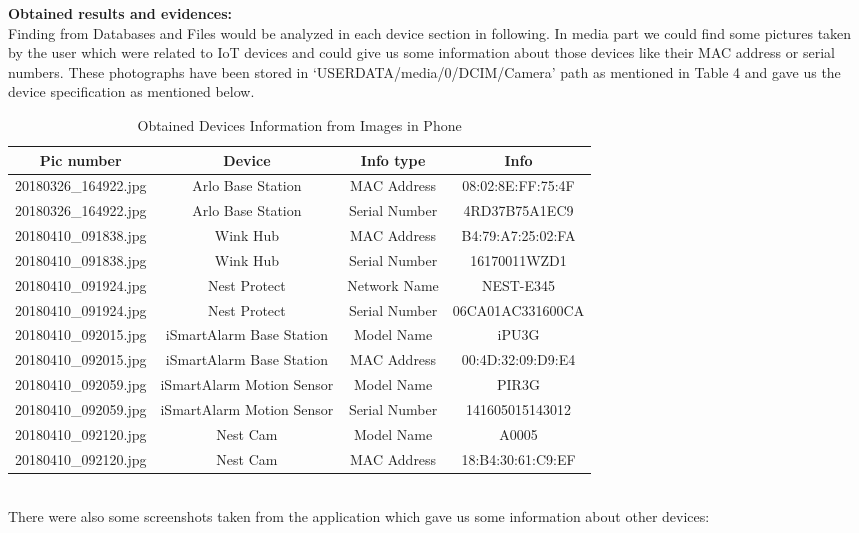 \documentclass{easychair}
\begin{document}
\begin{enumerate}
\textbf{Obtained results and evidences:}\\
Finding from Databases and Files would be analyzed in each device section in following. In media part we could find some pictures taken by the user which were related to IoT devices and could give us some information about those devices like their MAC address or serial numbers. These photographs have been stored in ‘USERDATA/media/0/DCIM/Camera’ path as mentioned in Table 4 and gave us the device specification as mentioned below.\\


\begin{table}[]
\begin{tabular}{|c|c|c|c|}							 
\hline
Pic number	& Device &	Info type &	Info\\
\hline
20180326\_164922.jpg & Arlo Base Station & MAC Address & 08:02:8E:FF:75:4F\\
\hline
20180326\_164922.jpg & Arlo Base Station & Serial Number & 4RD37B75A1EC9\\
\hline
20180410\_091838.jpg & Wink Hub & MAC Address	& B4:79:A7:25:02:FA\\
\hline
20180410\_091838.jpg & Wink Hub & Serial Number & 16170011WZD1\\
\hline
20180410\_091924.jpg & Nest Protect & Network Name & NEST-E345\\
\hline
20180410\_091924.jpg & Nest Protect & Serial Number & 06CA01AC331600CA\\
\hline
20180410\_092015.jpg & iSmartAlarm Base Station & Model Name & iPU3G\\
\hline
20180410\_092015.jpg & iSmartAlarm Base Station & MAC Address & 00:4D:32:09:D9:E4\\
\hline
20180410\_092059.jpg & iSmartAlarm Motion Sensor & Model Name & PIR3G\\
\hline
20180410\_092059.jpg & iSmartAlarm Motion Sensor & Serial Number & 141605015143012\\
\hline
20180410\_092120.jpg & Nest Cam & Model Name & A0005\\
\hline
20180410\_092120.jpg & Nest Cam & MAC Address & 18:B4:30:61:C9:EF\\
\hline
\end{tabular}
 \caption{Obtained Devices Information from Images in Phone}
   \label{tab:my_label}
\end{table}\\
There were also some screenshots taken from the application which gave us some information about other devices:\\


\end{enumerate}
\end{document}
